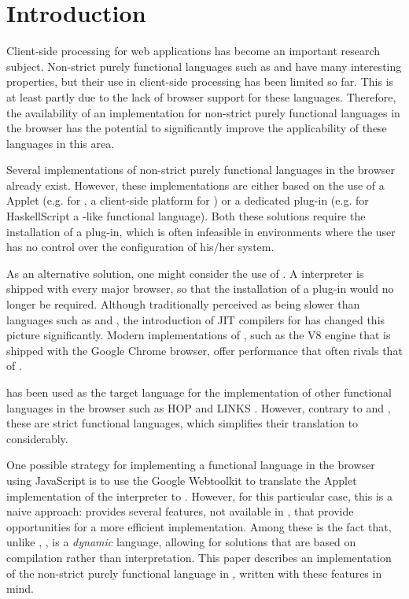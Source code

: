 \section{Introduction}\label{sapljs:sec:intro}
Client-side processing for web applications has become an important research
subject. Non-strict purely functional languages such as \Haskell and \Clean have
many interesting properties, but their use in client-side processing has been
limited so far. This is at least partly due to the lack of browser support for
these languages. Therefore, the availability of  an implementation for
non-strict purely functional languages in the browser has the potential to
significantly improve the applicability of these languages in this area.

Several implementations of non-strict purely functional languages in the browser
already exist. However, these implementations are either based on the use of a
\Java Applet (e.g. for \Sapl, a client-side platform for \Clean
\cite{JKP, PJKA}) or a dedicated plug-in (e.g. for \textsf{HaskellScript} 
\cite{HaskellScript} a \Haskell-like functional language). Both these solutions
require the installation of a plug-in, which is often infeasible in environments
where the user has no control over the configuration of his/her system.

As an alternative solution, one might consider the use of \JavaScript. A
\JavaScript interpreter is shipped with every major browser, so that the
installation of a plug-in would no longer be required.  Although traditionally
perceived as being slower than languages such as \Java and \C, the introduction 
of JIT compilers for \JavaScript has changed this picture significantly. Modern
implementations of \JavaScript, such as the V8 engine that is shipped with the
Google Chrome browser, offer performance that often rivals that of \Java.

\JavaScript has been used as the target language for the implementation of
other functional languages in the browser such as HOP and LINKS
\cite{HOP1, HOP2, LINKS1}. However, contrary to \Haskell and \Clean, these are
strict functional languages, which simplifies their translation to \JavaScript
considerably.

One possible strategy for implementing a functional language in the browser
using JavaScript is to use the Google Webtoolkit to translate the \Java Applet
implementation of the \Sapl interpreter to \JavaScript. However, for this
particular case, this is a naive approach: \JavaScript provides several
features, not available in \Java, that provide opportunities for a more
efficient implementation. Among these is the fact that, unlike \Java,
\JavaScript, is a {\em dynamic} language, allowing for solutions that are based
on compilation rather than interpretation. This paper describes an
implementation of the non-strict purely functional language \Sapl in
\JavaScript, written with these features in mind.

